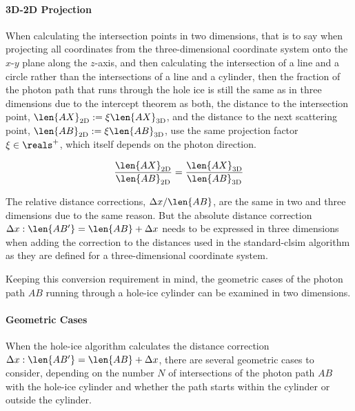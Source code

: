 \paragraph{3D-2D Projection}
When calculating the intersection points in two dimensions, that is to say when projecting all coordinates from the three-dimensional coordinate system onto the $x$-$y$ plane along the $z$-axis, and then calculating the intersection of a line and a circle rather than the intersections of a line and a cylinder, then the fraction of the photon path that runs through the hole ice is still the same as in three dimensions due to the intercept theorem as both, the distance to the intersection point, $\len{AX}_\text{2D}:=\xi \len{AX}_\text{3D}$, and the distance to the next scattering point, $\len{AB}_\text{2D}:=\xi \len{AB}_\text{3D}$, use the same projection factor $\xi \in \reals^+$, which itself depends on the photon direction.

$$
  \frac{\len{AX}_\text{2D}}{\len{AB}_\text{2D}} = \frac{\len{AX}_\text{3D}}{\len{AB}_\text{3D}}
$$

The relative distance corrections, $\Delta x / \len{AB}$, are the same in two and three dimensions due to the same reason. But the absolute distance correction $\Delta x : \len{AB'} = \len{AB} + \Delta x$ needs to be expressed in three dimensions when adding the correction to the distances used in the standard-clsim algorithm as they are defined for a three-dimensional coordinate system.

Keeping this conversion requirement in mind, the geometric cases of the photon path $AB$ running through a hole-ice cylinder can be examined in two dimensions.

\paragraph{Geometric Cases}
%
When the hole-ice algorithm calculates the distance correction $\Delta x: \len{AB'} = \len{AB} + \Delta x$, there are several geometric cases to consider, depending on the number $N$ of intersections of the photon path $AB$ with the hole-ice cylinder and whether the path starts within the cylinder or outside the cylinder.

